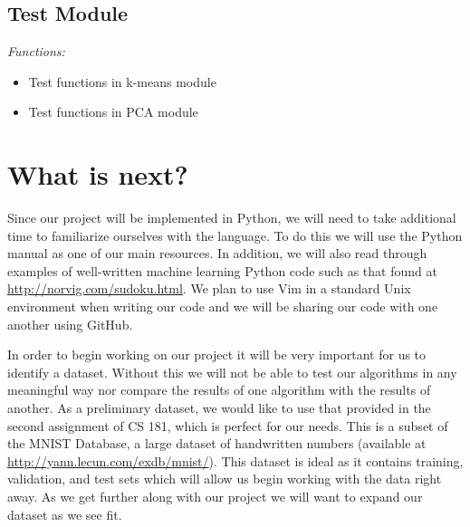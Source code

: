 \documentclass[12pt]{article} %
\begin{document}
\subsection{Test Module}
\emph{Functions:}
	\begin{itemize}
		\item Test functions in k-means module  
		\item Test functions in PCA module 
	\end{itemize}



\section{What is next?}

Since our project will be implemented in Python, we will need to take additional time to familiarize ourselves with the language.  To do this we will use the Python manual as one of our main resources.  In addition, we will also read through examples of well-written machine learning Python code such as that found at \url{http://norvig.com/sudoku.html}.  We plan to use Vim in a standard Unix environment when writing our code and we will be sharing our code with one another using GitHub.

In order to begin working on our project it will be very important for us to identify a dataset.  Without this we will not be able to test our algorithms in any meaningful way nor compare the results of one algorithm with the results of another.  As a preliminary dataset, we would like to use that provided in the second assignment of CS 181, which is perfect for our needs. This is a subset of the MNIST Database, a large dataset of handwritten numbers (available at \url{http://yann.lecun.com/exdb/mnist/}).  This dataset is ideal as it contains training, validation, and test sets which will allow us begin working with the data right away.  As we get further along with our project we will want to expand our dataset as we see fit.
\end{document}
